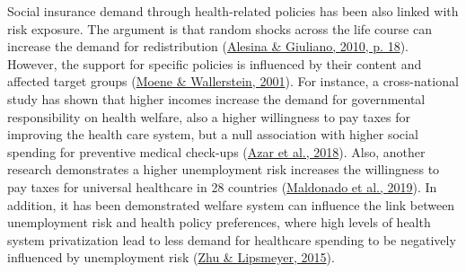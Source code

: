 \documentclass[
  12pt,
]{book}
\begin{document}
Social insurance demand through health-related policies has been also linked with risk exposure. The argument is that random shocks across the life course can increase the demand for redistribution (\protect\hyperlink{ref-alesina_preferences_2010}{Alesina \& Giuliano, 2010, p. 18}). However, the support for specific policies is influenced by their content and affected target groups (\protect\hyperlink{ref-moene_inequality_2001}{Moene \& Wallerstein, 2001}). For instance, a cross-national study has shown that higher incomes increase the demand for governmental responsibility on health welfare, also a higher willingness to pay taxes for improving the health care system, but a null association with higher social spending for preventive medical check-ups (\protect\hyperlink{ref-Azaretal2018}{Azar et al., 2018}). Also, another research demonstrates a higher unemployment risk increases the willingness to pay taxes for universal healthcare in 28 countries (\protect\hyperlink{ref-Maldonadoetal2019}{Maldonado et al., 2019}). In addition, it has been demonstrated welfare system can influence the link between unemployment risk and health policy preferences, where high levels of health system privatization lead to less demand for healthcare spending to be negatively influenced by unemployment risk (\protect\hyperlink{ref-zhu_policy_2015}{Zhu \& Lipsmeyer, 2015}).
\end{document}

